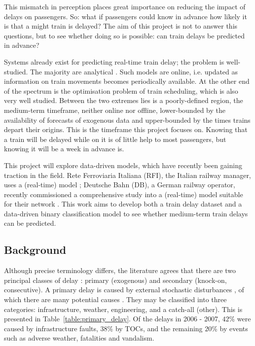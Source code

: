 \documentclass[12pt,a4paper]{article}
\begin{document}
This mismatch in perception places great importance on reducing the impact of delays on passengers. So: what if passengers could know in advance how likely it is that a might train is delayed? The aim of this project is not to answer this questions, but to see whether doing so is possible: can train delays be predicted in advance? 

Systems already exist for predicting real-time train delay; the problem is well-studied. The majority are analytical \cite{oneto_et_al_2016}. Such models are online, i.e. updated as information on train movements becomes periodically available. At the other end of the spectrum is the optimisation problem of train scheduling, which is also very well studied. Between the two extremes lies is a poorly-defined region, the medium-term timeframe, neither online nor offline, lower-bounded by the availability of forecasts of exogenous data and upper-bounded by the times trains depart their origins. This is the timeframe this project focuses on. Knowing that a train will be delayed while on it is of little help to most passengers, but knowing it will be a week in advance is. 

This project will explore data-driven models, which have recently been gaining traction in the field. Rete Ferroviaria Italiana (RFI), the Italian railway manager, uses a (real-time) model \cite{oneto_et_al_2016}; Deutsche Bahn (DB), a German railway operator, recently commissioned a comprehensive study into a (real-time) model suitable for their network \cite{lessan_fu_wen_2019}. This work aims to develop both a train delay dataset and a data-driven binary classification model to see whether medium-term train delays can be predicted.

\subsection{Background}
\label{subsection:background}

Although precise terminology differs, the literature agrees that there are two principal classes of delay \cite{olsson_haugland_2004}: primary (exogenous) and secondary (knock-on, consecutive). A primary delay is caused by external stochastic disturbances \cite{oneto_et_al_2016}, of which there are many potential causes \cite{berger_et_al_2011,milinkovic_et_al_2013}. They may be classified into three categories: infrastructure, weather, engineering, and a catch-all (other). This is presented in Table~\ref{table:primary_delay}. Of the delays in 2006 - 2007, $42$\% were caused by infrastructure faults, $38$\% by TOCs, and the remaining $20$\% by events such as adverse weather, fatalities and vandalism. 
\end{document}
